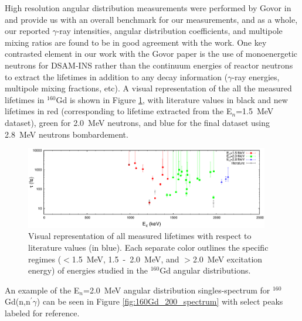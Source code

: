 High resolution angular distribution measurements were performed by Govor in \cite{Govor_160Gd_2009} and provide us with an overall benchmark for our measurements, and as a whole, our reported $\gamma$-ray intensities, angular distribution coefficients, and multipole mixing ratios are found to be in good agreement with the work. One key contrasted element in our work with the Govor paper is the use of monoenergetic neutrons for DSAM-INS rather than the continuum energies of reactor neutrons to extract the lifetimes in addition to any decay information ($\gamma$-ray energies, multipole mixing fractions, etc). A visual representation of the all the measured lifetimes in $^{160}$Gd is shown in Figure \ref{fig:160Gd_viz_lifetimes}, with literature values in black and new lifetimes in red (corresponding to lifetime extracted from the E$_n$=1.5~MeV dataset), green for 2.0~MeV neutrons, and blue for the final dataset using 2.8~MeV neutrons bombardement. %

\begin{figure}[h!]
\begin{center}
\includegraphics[width=0.95\textwidth]{160Gd_viz_lifetimes.eps}
\caption{Visual representation of all measured lifetimes with respect to literature values (in blue). Each separate color outlines the specific regimes ($<$1.5~MeV, 1.5~-~2.0~MeV, and $>$2.0~MeV excitation energy) of energies studied in the $^{160}$Gd angular distributions. \label{fig:160Gd_viz_lifetimes}}
\end{center}
\end{figure}

An example of the E$_n$=2.0~MeV angular distribution singles-spectrum for $^{160}$Gd(n,n$^\prime\gamma$) can be seen in Figure \ref{fig:160Gd_200_spectrum} with select peaks labeled for reference.

